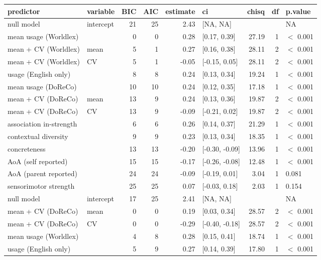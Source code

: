 \begin{table}[ht]
\centering
\begin{tabular}{llrrrlrrl}
  \hline
predictor & variable & BIC & AIC & estimate & ci & chisq & df & p.value \\ 
  \hline
null model & intercept & 21 & 25 & 2.43 & [NA, NA] &  &  & NA \\ 
  mean usage (Worldlex) &  & 0 & 0 & 0.28 & [0.17, 0.39] & 27.19 & 1 & $<$ 0.001 \\ 
  mean + CV (Worldlex) & mean & 5 & 1 & 0.27 & [0.16, 0.38] & 28.11 & 2 & $<$ 0.001 \\ 
  mean + CV (Worldlex) & CV & 5 & 1 & -0.05 & [-0.15, 0.05] & 28.11 & 2 & $<$ 0.001 \\ 
  usage (English only) &  & 8 & 8 & 0.24 & [0.13, 0.34] & 19.24 & 1 & $<$ 0.001 \\ 
  mean usage (DoReCo) &  & 10 & 10 & 0.24 & [0.12, 0.35] & 17.18 & 1 & $<$ 0.001 \\ 
  mean + CV (DoReCo) & mean & 13 & 9 & 0.24 & [0.13, 0.36] & 19.87 & 2 & $<$ 0.001 \\ 
  mean + CV (DoReCo) & CV & 13 & 9 & -0.09 & [-0.21, 0.02] & 19.87 & 2 & $<$ 0.001 \\ 
  association in-strength &  & 6 & 6 & 0.26 & [0.14, 0.37] & 21.29 & 1 & $<$ 0.001 \\ 
  contextual diversity &  & 9 & 9 & 0.23 & [0.13, 0.34] & 18.35 & 1 & $<$ 0.001 \\ 
  concreteness &  & 13 & 13 & -0.20 & [-0.30, -0.09] & 13.96 & 1 & $<$ 0.001 \\ 
  AoA (self reported) &  & 15 & 15 & -0.17 & [-0.26, -0.08] & 12.48 & 1 & $<$ 0.001 \\ 
  AoA (parent reported) &  & 24 & 24 & -0.09 & [-0.19, 0.01] & 3.04 & 1 & 0.081 \\ 
  sensorimotor strength &  & 25 & 25 & 0.07 & [-0.03, 0.18] & 2.03 & 1 & 0.154 \\ 
  null model & intercept & 17 & 25 & 2.41 & [NA, NA] &  &  & NA \\ 
  mean + CV (DoReCo) & mean & 0 & 0 & 0.19 & [0.03, 0.34] & 28.57 & 2 & $<$ 0.001 \\ 
  mean + CV (DoReCo) & CV & 0 & 0 & -0.29 & [-0.40, -0.18] & 28.57 & 2 & $<$ 0.001 \\ 
  mean usage (Worldlex) &  & 4 & 8 & 0.28 & [0.15, 0.41] & 18.74 & 1 & $<$ 0.001 \\ 
  usage (English only) &  & 5 & 9 & 0.27 & [0.14, 0.39] & 17.80 & 1 & $<$ 0.001 \\ 

\end{tabular}
\end{table}
